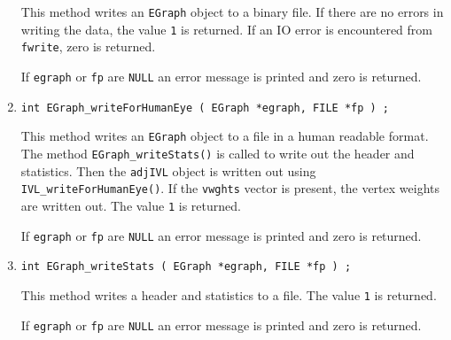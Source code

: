 \begin{enumerate}
\par
This method writes an {\tt EGraph} object to a binary file.
If there are no errors in writing the data, 
the value {\tt 1} is returned.
If an IO error is encountered from {\tt fwrite}, zero is returned.
\par {}
If {\tt egraph} or {\tt fp} are {\tt NULL} 
an error message is printed and zero is returned.
\item
\begin{verbatim}
int EGraph_writeForHumanEye ( EGraph *egraph, FILE *fp ) ;
\end{verbatim}
\par
This method writes an {\tt EGraph} object to a file in a human
readable format.
The method {\tt EGraph\_writeStats()} 
is called to write out the
header and statistics. 
Then the {\tt adjIVL} object is written out using
{\tt IVL\_writeForHumanEye()}.
If the {\tt vwghts} vector is present, the vertex weights are
written out.
The value {\tt 1} is returned.
\par {}
If {\tt egraph} or {\tt fp} are {\tt NULL} 
an error message is printed and zero is returned.
\item
\begin{verbatim}
int EGraph_writeStats ( EGraph *egraph, FILE *fp ) ;
\end{verbatim}
\par
This method writes a header and statistics to a file.
The value {\tt 1} is returned.
\par {}
If {\tt egraph} or {\tt fp} are {\tt NULL} 
an error message is printed and zero is returned.
\end{enumerate}

